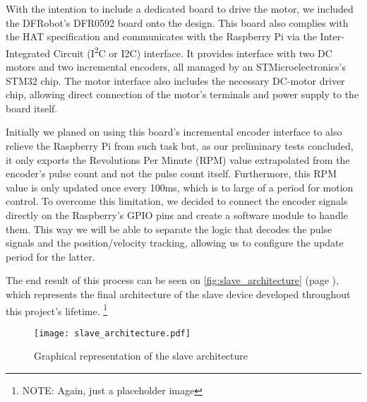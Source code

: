 With the intention to include a dedicated board to drive the motor, we included the DFRobot's DFR0592 \cite {hdw:dfr0592} board onto the design.
This board also complies with the HAT specification and communicates with the Raspberry Pi via the Inter-Integrated Circuit (I\textsuperscript{2}C or I2C) interface.
It provides interface with two DC motors and two incremental encoders, all managed by an STMicroelectronics's STM32 chip.
The motor interface also includes the necessary DC-motor driver chip, allowing direct connection of the motor's terminals and power supply to the board itself.

Initially we planed on using this board's incremental encoder interface to also relieve the Raspberry Pi from such task but, as our preliminary tests concluded, it only exports the Revolutions Per Minute (RPM) value extrapolated from the encoder's pulse count and not the pulse count itself.
Furthermore, this RPM value is only updated once every 100ms, which is to large of a period for motion control.
To overcome this limitation, we decided to connect the encoder signals directly on the Raspberry's GPIO pins and create a software module to handle them.
This way we will be able to separate the logic that decodes the pulse signals and the position/velocity tracking, allowing us to configure the update period for the latter.

The end result of this process can be seen on \autoref{fig:slave_architecture} (page \pageref{fig:slave_architecture}), which represents the final architecture of the slave device developed throughout this project's lifetime. \footnote{NOTE: Again, just a placeholder image}

\begin{figure}[htp]
	\centering
	\texttt{[image: slave\_architecture.pdf]}
	\caption{Graphical representation of the slave architecture}
	\label{fig:slave_architecture}
\end{figure}
